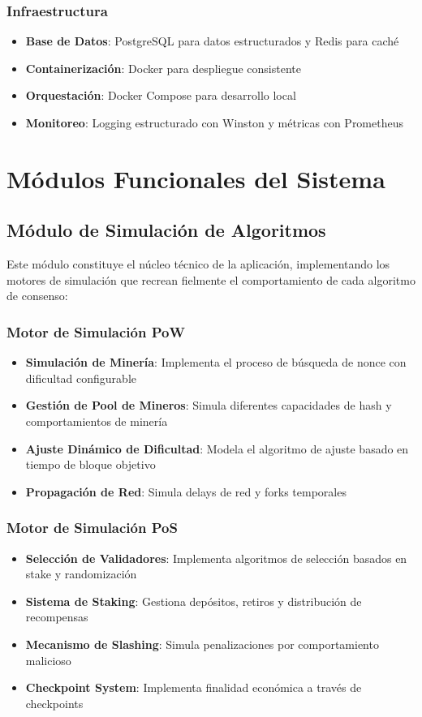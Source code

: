 \documentclass[spanish,12pt,letterpaper]{report}
\begin{document}
\subsubsection{Infraestructura}
\begin{itemize}
    \item \textbf{Base de Datos}: PostgreSQL para datos estructurados y Redis para caché
    \item \textbf{Containerización}: Docker para despliegue consistente
    \item \textbf{Orquestación}: Docker Compose para desarrollo local
    \item \textbf{Monitoreo}: Logging estructurado con Winston y métricas con Prometheus
\end{itemize}

\section{Módulos Funcionales del Sistema}

\subsection{Módulo de Simulación de Algoritmos}

Este módulo constituye el núcleo técnico de la aplicación, implementando los motores de simulación que recrean fielmente el comportamiento de cada algoritmo de consenso:

\subsubsection{Motor de Simulación PoW}
\begin{itemize}
    \item \textbf{Simulación de Minería}: Implementa el proceso de búsqueda de nonce con dificultad configurable
    \item \textbf{Gestión de Pool de Mineros}: Simula diferentes capacidades de hash y comportamientos de minería
    \item \textbf{Ajuste Dinámico de Dificultad}: Modela el algoritmo de ajuste basado en tiempo de bloque objetivo
    \item \textbf{Propagación de Red}: Simula delays de red y forks temporales
\end{itemize}

\subsubsection{Motor de Simulación PoS}
\begin{itemize}
    \item \textbf{Selección de Validadores}: Implementa algoritmos de selección basados en stake y randomización
    \item \textbf{Sistema de Staking}: Gestiona depósitos, retiros y distribución de recompensas
    \item \textbf{Mecanismo de Slashing}: Simula penalizaciones por comportamiento malicioso
    \item \textbf{Checkpoint System}: Implementa finalidad económica a través de checkpoints
\end{itemize}
\end{document}
